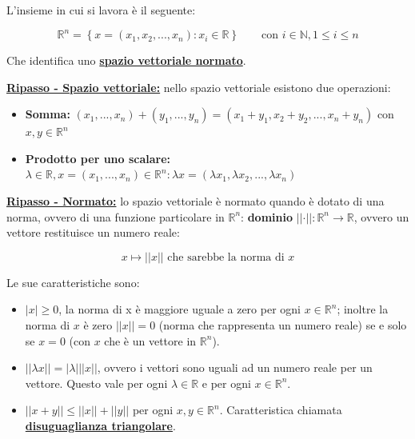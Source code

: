 \documentclass[a4paper]{article}
\begin{document}
	L'insieme in cui si lavora è il seguente:
	
	\begin{equation*}
		\mathbb{R}^{n} = \left\{x = \left(x_{1}, x_{2}, ..., x_{n}\right) : x_{i} \in \mathbb{R}\right\} \hspace{2em} \text{con } i \in \mathbb{N}, 1 \le i \le n
	\end{equation*}

	\noindent
	Che identifica uno \textbf{\underline{spazio vettoriale normato}}.\newline
	
	\noindent
	\textcolor{Red3}{\textbf{\underline{Ripasso - Spazio vettoriale:}}} nello spazio vettoriale esistono due operazioni:
	
	\begin{itemize}
		\item \textbf{Somma:} $\left(x_{1}, ..., x_{n}\right) + \left(y_{1}, ..., y_{n}\right) = \left(x_{1} + y_{1}, x_{2} + y_{2}, ..., x_{n} + y_{n}\right)$ con $x,y \in \mathbb{R}^{n}$
		
		\item \textbf{Prodotto per uno scalare:} $\lambda \in \mathbb{R}, x = \left(x_{1}, ..., x_{n}\right) \in \mathbb{R}^{n} : \lambda x = \left(\lambda x_{1}, \lambda x_{2}, ..., \lambda x_{n}\right)$
	\end{itemize}
	\:\newline

	\noindent
	\textcolor{Red3}{\textbf{\underline{Ripasso - Normato:}}} lo spazio vettoriale è normato quando è dotato di una norma, ovvero di una funzione particolare in $\mathbb{R}^{n}$: \textbf{dominio} $\Big||\cdot|\Big| : \mathbb{R}^{n} \longrightarrow \mathbb{R}$, ovvero un vettore restituisce un numero reale:
	
	\begin{equation*}
		x \longmapsto \Big||x|\Big| \text{ che sarebbe la norma di } x
	\end{equation*}

	\noindent
	Le sue caratteristiche sono:
	
	\begin{itemize}
		\item $\Big|x\Big| \ge 0$, la norma di x è maggiore uguale a zero per ogni $x \in \mathbb{R}^{n}$; inoltre la norma di $x$ è zero $\Big||x|\Big| = 0$ (norma che rappresenta un numero reale) se e solo se $x = 0$ (con $x$ che è un vettore in $\mathbb{R}^{n}$).
		
		\item $\Big||\lambda x|\Big| = |\lambda| \Big||x|\Big|$, ovvero i vettori sono uguali ad un numero reale per un vettore. Questo vale per ogni $\lambda \in \mathbb{R}$ e per ogni $x \in \mathbb{R}^{n}$.
		
		\item $\Big||x+y|\Big| \le \Big||x|\Big| + \Big||y|\Big|$ per ogni $x,y \in \mathbb{R}^{n}$. Caratteristica chiamata \textcolor{Red3}{\textbf{\underline{disuguaglianza triangolare}}}.
	\end{itemize}
\end{document}

